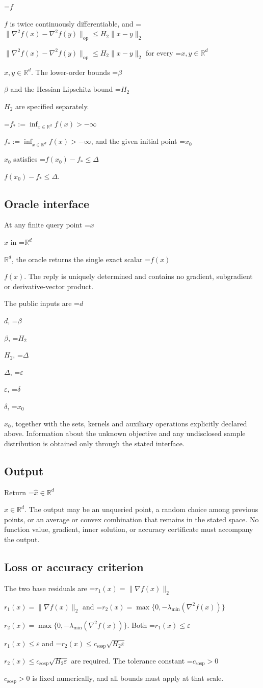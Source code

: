 \documentclass[10pt,a4paper]{article}
\newcommand{\AtlasMath}[1]{\par\begingroup\centering\setbox0=\hbox{$\displaystyle #1$}\ifdim\wd0>1.4\linewidth\typeout{ATLAS WIDE FORMULA: \the\wd0}\fi\ifdim\wd0>\linewidth\resizebox{\linewidth}{!}{\box0}\else\box0\fi\par\endgroup}
\newcommand{\AtlasInlineMath}[1]{\begingroup\setbox0=\hbox{$#1$}\ifdim\wd0>.4\linewidth\endgroup\AtlasMath{#1}\else\endgroup$#1$\fi}
\begin{document}
\AtlasInlineMath{f} is twice continuously differentiable, and \AtlasInlineMath{\|\nabla^2f(x)-\nabla^2f(y)\|_{\mathrm{op}}\le H_2\|x-y\|_2} for every \AtlasInlineMath{x,y\in\mathbb{R}^d}. The lower-order bounds \AtlasInlineMath{\beta} and the Hessian Lipschitz bound \AtlasInlineMath{H_2} are specified separately.

\AtlasInlineMath{f_*:=\inf_{x\in\mathbb{R}^d}f(x)>-\infty}, and the given initial point \AtlasInlineMath{x_0} satisfies \AtlasInlineMath{f(x_0)-f_*\le\Delta}.

\subsection{Oracle interface}
At any finite query point \AtlasInlineMath{x} in \AtlasInlineMath{\mathbb{R}^d}, the oracle returns the single exact scalar \AtlasInlineMath{f(x)}. The reply is uniquely determined and contains no gradient, subgradient or derivative-vector product.

The public inputs are \AtlasInlineMath{d}, \AtlasInlineMath{\beta}, \AtlasInlineMath{H_2}, \AtlasInlineMath{\Delta}, \AtlasInlineMath{\varepsilon}, \AtlasInlineMath{\delta}, \AtlasInlineMath{x_0}, together with the sets, kernels and auxiliary operations explicitly declared above. Information about the unknown objective and any undisclosed sample distribution is obtained only through the stated interface.

\subsection{Output}
Return \AtlasInlineMath{\widehat{x}\in \mathbb{R}^d}. The output may be an unqueried point, a random choice among previous points, or an average or convex combination that remains in the stated space. No function value, gradient, inner solution, or accuracy certificate must accompany the output.

\subsection{Loss or accuracy criterion}
The two base residuals are \AtlasInlineMath{r_1(x)=\|\nabla f(x)\|_2} and \AtlasInlineMath{r_2(x)=\max\{0,-\lambda_{\min}(\nabla^2f(x))\}}. Both \AtlasInlineMath{r_1(x)\le\varepsilon} and \AtlasInlineMath{r_2(x)\le c_{\mathrm{sosp}}\sqrt{H_2\varepsilon}} are required. The tolerance constant \AtlasInlineMath{c_{\mathrm{sosp}}>0} is fixed numerically, and all bounds must apply at that scale.
\end{document}
